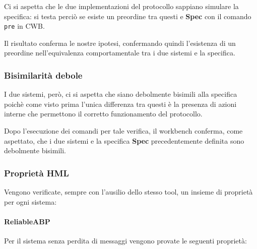 Ci si aspetta che le due implementazioni del protocollo sappiano simulare la
specifica: si testa perciò se esiste un preordine tra questi e \textbf{Spec}
con il comando \texttt{pre} in CWB.

Il risultato conferma le nostre ipotesi, confermando quindi l'esistenza di un
preordine nell'equivalenza comportamentale tra i due sistemi e la specifica.

\subsubsection{Bisimilarità debole}

I due sistemi, però, ci si aspetta che siano debolmente bisimili alla
specifica poichè come visto prima l'unica differenza tra questi è la presenza
di azioni interne che permettono il corretto funzionamento del protocollo.

Dopo l'esecuzione dei comandi per tale verifica, il workbench conferma, come
aspettato, che i due sistemi e la specifica \textbf{Spec} precedentemente
definita sono debolmente bisimili.

\subsubsection{Proprietà HML}

Vengono verificate, sempre con l'ausilio dello stesso tool, un insieme di
proprietà per ogni sistema:

\paragraph{ReliableABP} \mbox{}

Per il sistema senza perdita di messaggi vengono provate le seguenti proprietà:

